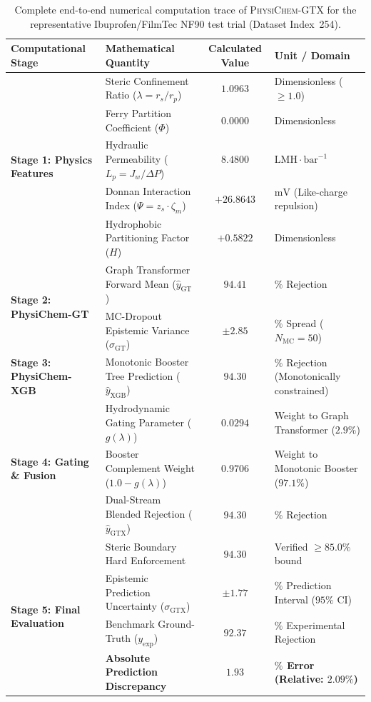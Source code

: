 \documentclass[11pt]{article}
\begin{document}
\begin{table}[H]
\centering
\small
\caption{Complete end-to-end numerical computation trace of \textsc{PhysiChem-GTX} for the representative Ibuprofen/FilmTec NF90 test trial (Dataset Index~254).}
\label{tab:s8_trace_summary}
\begin{tabular}{llcl}
\toprule
\textbf{Computational Stage} & \textbf{Mathematical Quantity} & \textbf{Calculated Value} & \textbf{Unit / Domain} \\
\midrule
\multirow{5}{*}{\textbf{Stage 1: Physics Features}}
& Steric Confinement Ratio ($\lambda = r_s / r_p$) & $1.0963$ & Dimensionless ($\ge 1.0$) \\
& Ferry Partition Coefficient ($\Phi$) & $0.0000$ & Dimensionless \\
& Hydraulic Permeability ($L_p = J_w / \Delta P$) & $8.4800$ & $\mathrm{LMH}\cdot\mathrm{bar}^{-1}$ \\
& Donnan Interaction Index ($\Psi = z_s \cdot \zeta_m$) & $+26.8643$ & $\mathrm{mV}$ (Like-charge repulsion) \\
& Hydrophobic Partitioning Factor ($H$) & $+0.5822$ & Dimensionless \\
\midrule
\multirow{2}{*}{\textbf{Stage 2: PhysiChem-GT}}
& Graph Transformer Forward Mean ($\hat{y}_{\mathrm{GT}}$) & $94.41$ & $\%$ Rejection \\
& MC-Dropout Epistemic Variance ($\sigma_{\mathrm{GT}}$) & $\pm 2.85$ & $\%$ Spread ($N_{\mathrm{MC}} = 50$) \\
\midrule
\textbf{Stage 3: PhysiChem-XGB}
& Monotonic Booster Tree Prediction ($\hat{y}_{\mathrm{XGB}}$) & $94.30$ & $\%$ Rejection (Monotonically constrained) \\
\midrule
\multirow{3}{*}{\textbf{Stage 4: Gating \& Fusion}}
& Hydrodynamic Gating Parameter ($g(\lambda)$) & $0.0294$ & Weight to Graph Transformer ($2.9\%$) \\
& Booster Complement Weight ($1.0 - g(\lambda)$) & $0.9706$ & Weight to Monotonic Booster ($97.1\%$) \\
& Dual-Stream Blended Rejection ($\hat{y}_{\mathrm{GTX}}$) & $94.30$ & $\%$ Rejection \\
\midrule
\multirow{4}{*}{\textbf{Stage 5: Final Evaluation}}
& Steric Boundary Hard Enforcement & $94.30$ & Verified $\ge 85.0\%$ bound \\
& Epistemic Prediction Uncertainty ($\sigma_{\mathrm{GTX}}$) & $\pm 1.77$ & $\%$ Prediction Interval ($95\%$ CI) \\
& Benchmark Ground-Truth ($y_{\mathrm{exp}}$) & $92.37$ & $\%$ Experimental Rejection \\
& \textbf{Absolute Prediction Discrepancy} & $\mathbf{1.93}$ & \textbf{$\%$ Error (Relative: $2.09\%$)} \\
\bottomrule
\end{tabular}
\end{table}
\end{document}
